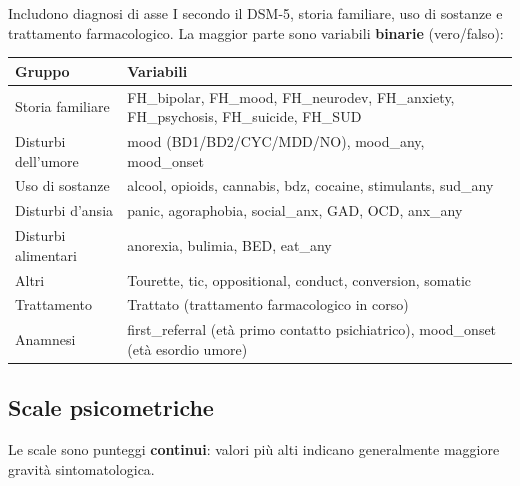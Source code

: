 \documentclass[12pt, a4paper]{article}
\begin{document}
Includono diagnosi di asse I secondo il DSM-5, storia familiare, uso di sostanze e
trattamento farmacologico. La maggior parte sono variabili \textbf{binarie} (vero/falso):

\begin{center}
\begin{tabular}{lp{8.5cm}}
\toprule
\textbf{Gruppo} & \textbf{Variabili} \\
\midrule
Storia familiare & FH\_bipolar, FH\_mood, FH\_neurodev, FH\_anxiety, FH\_psychosis, FH\_suicide, FH\_SUD \\
Disturbi dell'umore & mood (BD1/BD2/CYC/MDD/NO), mood\_any, mood\_onset \\
Uso di sostanze & alcool, opioids, cannabis, bdz, cocaine, stimulants, sud\_any \\
Disturbi d'ansia & panic, agoraphobia, social\_anx, GAD, OCD, anx\_any \\
Disturbi alimentari & anorexia, bulimia, BED, eat\_any \\
Altri & Tourette, tic, oppositional, conduct, conversion, somatic \\
Trattamento & Trattato (trattamento farmacologico in corso) \\
Anamnesi & first\_referral (età primo contatto psichiatrico), mood\_onset (età esordio umore) \\
\bottomrule
\end{tabular}
\end{center}

\subsection{Scale psicometriche}

Le scale sono punteggi \textbf{continui}: valori più alti indicano generalmente maggiore
gravità sintomatologica.
\end{document}
